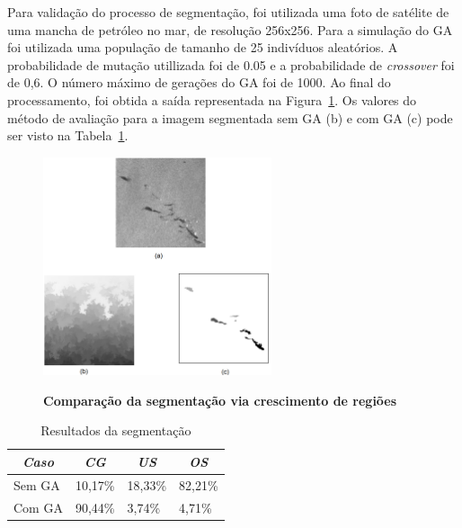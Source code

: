 \documentclass[12pt,oneside,a4paper,english,french,spanish,brazil,]{abntex2}
\begin{document}
Para validação do processo de segmentação, foi utilizada uma foto de satélite de uma mancha de petróleo no mar, de resolução 256x256. Para a simulação do GA foi utilizada uma população de tamanho de 25 indivíduos aleatórios. A probabilidade de mutação utillizada foi de 0.05 e a probabilidade de \textit{crossover} foi de 0,6. O número máximo de gerações do GA foi de 1000. Ao final do processamento, foi obtida a saída representada na Figura~\ref{fig:TrCo_Matias_Crescimento_1}. Os valores do método de avaliação para a imagem segmentada sem GA (b) e com GA (c) pode ser visto na Tabela~\ref{tab:TrCo_Matias_1}.

\begin{figure}[ht]
\centering
\caption{\textbf{Comparação da segmentação via crescimento de regiões}}
\includegraphics[width=0.6\textwidth]{imagens/TrCo_Matias_Crescimento_1.PNG}
\label{fig:TrCo_Matias_Crescimento_1}
\end{figure}

\begin{table}
\centering
\caption{Resultados da segmentação}
\label{tab:TrCo_Matias_1}
\begin{tabular}{llll}
\hline
\multicolumn{1}{c}{\textit{\textbf{Caso}}} & \multicolumn{1}{c}{\textit{\textbf{CG}}} & \multicolumn{1}{c}{\textit{\textbf{US}}} & \multicolumn{1}{c}{\textit{\textbf{OS}}} \\ \hline
Sem GA                                     & 10,17\%                                  & 18,33\%                                  & 82,21\%                                  \\
Com GA                                     & 90,44\%                                  & 3,74\%                                   & 4,71\%                                   \\ \hline
\end{tabular}
\end{table}
\end{document}
